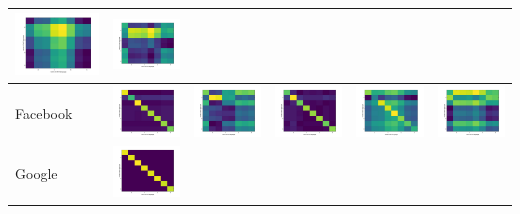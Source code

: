 \documentclass[12pt,german]{article}
\begin{document}
\begin{table}[H]
\begin{tabular}{| l | c | c | c | c | c |}
    \includegraphics[width=2.5cm]{../images/dictData/googleData.jpg} &
    \includegraphics[width=2.5cm]{../images/dictData/witzData.jpg} \\   
    \hline
    Facebook &
    \includegraphics[width=2.5cm]{../images/facebookData/abstractData.jpg} &
    \includegraphics[width=2.5cm]{../images/facebookData/dictData.jpg} &
    \includegraphics[width=2.5cm]{../images/facebookData/facebookData.jpg} &
    \includegraphics[width=2.5cm]{../images/facebookData/googleData.jpg} &
    \includegraphics[width=2.5cm]{../images/facebookData/witzData.jpg} \\
    \hline
    Google &
    \includegraphics[width=2.5cm]{../images/googleData/abstractData.jpg} &

\end{tabular}
\end{table}
\end{document}
